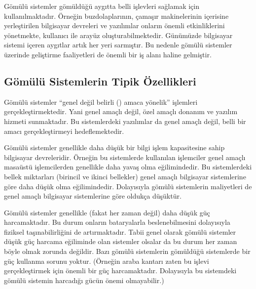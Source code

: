 \documentclass[letterpaper,10pt,turkish]{sphinxmanual}
\begin{document}
\sphinxAtStartPar
Gömülü sistemler gömüldüğü aygıtta belli işlevleri sağlamak için kullanılmaktadır. Örneğin
buzdolaplarının, çamaşır makinelerinin içerisine yerleştirilen bilgisayar devreleri ve yazılımlar
onların önemli etkinliklerini yönetmekte, kullanıcı ile arayüz oluşturabilmektedir. Günümüzde
bilgisayar sistemi içeren aygıtlar artık her yeri sarmıştır. Bu nedenle gömülü sistemler üzerinde
geliştirme faaliyetleri de önemli bir iş alanı haline gelmiştir.


\subsection{Gömülü Sistemlerin Tipik Özellikleri}
\label{\detokenize{introduction:gomulu-sistemlerin-tipik-ozellikleri}}\begin{description}
\sphinxAtStartPar
Gömülü sistemler “genel değil belirli () amaca yönelik” işlemleri gerçekleştirmektedir.
Yani genel amaçlı değil, özel amaçlı donanım ve yazılım hizmeti sunmaktadır. Bu sistemlerdeki
yazılımlar da genel amaçlı değil, belli bir amacı gerçekleştirmeyi hedeflemektedir.

\sphinxAtStartPar
Gömülü sistemler genellikle daha düşük bir bilgi işlem kapasitesine sahip bilgisayar
devreleridir. Örneğin bu sistemlerde kullanılan işlemciler genel amaçlı masaüstü işlemcilerden
genellikle daha yavaş olma eğilimindedir. Bu sistemlerdeki bellek miktarları (birincil ve ikinci
bellekler) genel amaçlı bilgisayar sistemlerine göre daha düşük olma eğilimindedir. Dolayısıyla
gömülü sistemlerin maliyetleri de genel amaçlı bilgisayar sistemlerine göre oldukça düşüktür.

\sphinxAtStartPar
Gömülü sistemler genellikle (fakat her zaman değil) daha düşük güç harcamaktadır. Bu durum
onların bataryalarla beslenebilmesini dolayısıyla fiziksel taşınabilirliğini de artırmaktadır.
Tabii genel olarak gömülü sistemler düşük güç harcama eğiliminde olan sistemler olsalar da bu
durum her zaman böyle olmak zorunda değildir. Bazı gömülü sistemlerin gömüldüğü sistemlerde bir
güç kullanma sorunu yoktur. (Örneğin araba kantarı zaten bu işlevi gerçekleştirmek için önemli
bir güç harcamaktadır. Dolayısıyla bu sistemdeki gömülü sistemin harcadığı gücün önemi
olmayabilir.)


\end{description}
\end{document}
